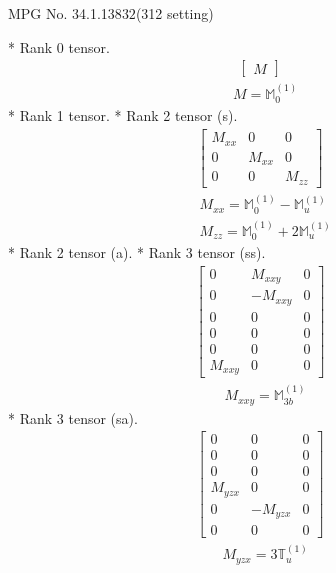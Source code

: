 \documentclass[fleqn,8pt,landscape]{jsarticle}
\begin{document}
\setcounter{MaxMatrixCols}{32}

\renewcommand{\tablename}{Table~}
\renewcommand{\figurename}{Figure~}
\begin{center}
\LARGE
MPG No. 34.1.138\quad$32$\quad(312 setting)
\end{center}
* Rank 0 tensor.
\begin{align*}
\begin{bmatrix} M \end{bmatrix}
\end{align*}
\begin{align*}
& M = \mathbb{M}_{0}^{(1)}
\end{align*}
* Rank 1 tensor.
* Rank 2 tensor (s).
\begin{align*}
\begin{bmatrix} M_{xx} & 0 & 0 \\ 0 & M_{xx} & 0 \\ 0 & 0 & M_{zz} \end{bmatrix}
\end{align*}
\begin{align*}
& M_{xx} = \mathbb{M}_{0}^{(1)} - \mathbb{M}_{u}^{(1)} \\
& M_{zz} = \mathbb{M}_{0}^{(1)} + 2 \mathbb{M}_{u}^{(1)}
\end{align*}
* Rank 2 tensor (a).
* Rank 3 tensor (ss).
\begin{align*}
\begin{bmatrix} 0 & M_{xxy} & 0 \\ 0 & - M_{xxy} & 0 \\ 0 & 0 & 0 \\ 0 & 0 & 0 \\ 0 & 0 & 0 \\ M_{xxy} & 0 & 0 \end{bmatrix}
\end{align*}
\begin{align*}
& M_{xxy} = \mathbb{M}_{3b}^{(1)}
\end{align*}
* Rank 3 tensor (sa).
\begin{align*}
\begin{bmatrix} 0 & 0 & 0 \\ 0 & 0 & 0 \\ 0 & 0 & 0 \\ M_{yzx} & 0 & 0 \\ 0 & - M_{yzx} & 0 \\ 0 & 0 & 0 \end{bmatrix}
\end{align*}
\begin{align*}
& M_{yzx} = 3 \mathbb{T}_{u}^{(1)}
\end{align*}
\end{document}
